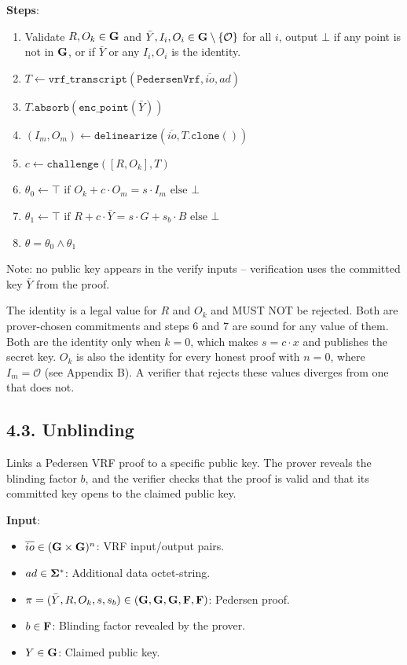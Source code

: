 \documentclass[
]{article}
\providecommand{\tightlist}{%
  \setlength{\itemsep}{0pt}\setlength{\parskip}{0pt}}
\begin{document}
\textbf{Steps}:

\begin{enumerate}
\def\labelenumi{\arabic{enumi}.}
\tightlist
\item
  Validate \(R, O_k \in \bold{G}\) and
  \(\bar{Y}, I_i, O_i \in \bold{G}\setminus \{\mathcal{O}\}\) for all
  \(i\), output \(\bot\) if any point is not in \(\bold{G}\), or if
  \(\bar{Y}\) or any \(I_i, O_i\) is the identity.
\item
  \(T \gets \texttt{vrf\_transcript}(\texttt{PedersenVrf}, \overline{io}, ad)\)
\item
  \(T.\texttt{absorb}(\texttt{enc\_point}(\bar{Y}))\)
\item
  \((I_m, O_m) \gets \texttt{delinearize}(\overline{io}, T.\texttt{clone}())\)
\item
  \(c \gets \texttt{challenge}([R, O_k], T)\)
\item
  \(\theta_0 \gets \top \text{ if } O_k + c \cdot O_m = s \cdot I_m \text{ else } \bot\)
\item
  \(\theta_1 \gets \top \text{ if } R + c \cdot \bar{Y} = s \cdot G + s_b \cdot B \text{ else } \bot\)
\item
  \(\theta = \theta_0 \land \theta_1\)
\end{enumerate}

Note: no public key appears in the verify inputs -- verification uses
the committed key \(\bar{Y}\) from the proof.

The identity is a legal value for \(R\) and \(O_k\) and MUST NOT be
rejected. Both are prover-chosen commitments and steps 6 and 7 are sound
for any value of them. Both are the identity only when \(k = 0\), which
makes \(s = c \cdot x\) and publishes the secret key. \(O_k\) is also
the identity for every honest proof with \(n = 0\), where
\(I_m = \mathcal{O}\) (see Appendix B). A verifier that rejects these
values diverges from one that does not.

\subsection{4.3. Unblinding}\label{unblinding}

Links a Pedersen VRF proof to a specific public key. The prover reveals
the blinding factor \(b\), and the verifier checks that the proof is
valid and that its committed key opens to the claimed public key.

\textbf{Input}:

\begin{itemize}
\tightlist
\item
  \(\overline{io} \in (\bold{G}\times \bold{G})^n\): VRF input/output
  pairs.
\item
  \(ad \in \bold{\Sigma}^*\): Additional data octet-string.
\item
  \(\pi = (\bar{Y}, R, O_k, s, s_b) \in (\bold{G}, \bold{G}, \bold{G}, \bold{F}, \bold{F})\):
  Pedersen proof.
\item
  \(b \in \bold{F}\): Blinding factor revealed by the prover.
\item
  \(Y \in \bold{G}\): Claimed public key.
\end{itemize}
\end{document}
